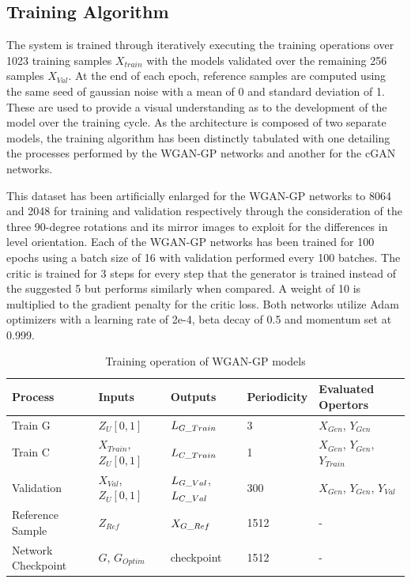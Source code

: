 \documentclass{Configuration_Files/PoliMi3i_thesis}
\begin{document}
\subsection{Training Algorithm}
The system is trained through iteratively executing the training operations over 1023
training samples $X_{train}$ with the models validated over the remaining 256 samples 
$X_{Val}$. At the end of each epoch, reference samples are computed using the same 
seed of gaussian noise with a mean of 0 and standard deviation of 1. These are used to 
provide a visual understanding as to the development of the model over the training cycle. 
As the architecture is composed of two separate models, the training algorithm has been 
distinctly tabulated with one detailing the processes performed by the WGAN-GP networks and 
another for the cGAN networks.

This dataset has been artificially enlarged for the WGAN-GP networks to 8064 and 2048 
for training and validation respectively through the consideration of the three 
90-degree rotations and its mirror images to exploit for the differences in level 
orientation. Each of the WGAN-GP networks has been trained for 
100 epochs using a batch size of 16 with validation performed every 100 batches. 
The critic is trained for 3 steps for every step that the generator is trained instead of the 
suggested 5 but performs similarly when compared. A weight of 10 is multiplied to the 
gradient penalty for the critic loss. Both networks utilize Adam optimizers with a learning 
rate of 2e-4, beta decay of 0.5 and momentum set at 0.999.
\begin{table}[H]
\centering 
\begin{tabular}{ |C{2.5cm}|C{2.5cm}|C{2.5cm}|C{2.5cm}|C{2.5cm}|}
\hline
\textbf{Process} & \textbf{Inputs} & \textbf{Outputs} & \textbf{Periodicity} & \textbf{Evaluated Opertors} \\
\hline
Train G & $Z_{U}[0,1]$ & $L_{G\char`_Train}$ & 3 & $X_{Gen}$, $Y_{Gen}$\\
\hline
Train C & $X_{Train}$, $Z_{U}[0,1]$ & $L_{C\char`_Train}$ & 1 & $X_{Gen}$, $Y_{Gen}$, $Y_{Train}$\\
\hline
Validation & $X_{Val}$, $Z_{U}[0,1]$ & $L_{G\char`_Val}$, $L_{C\char`_Val}$ & 300 & $X_{Gen}$, $Y_{Gen}$, $Y_{Val}$\\
\hline
Reference Sample & $Z_{Ref}$ & $X_{G\char`_Ref}$ & 1512 & -\\
\hline
Network Checkpoint & $G$, $G_{Optim}$ & checkpoint & 1512 & -\\
\hline
\end{tabular}
\\[10pt]
\caption{Training operation of WGAN-GP models}
\label{table:wgantrain}
\end{table}
\newpage
\end{document}
